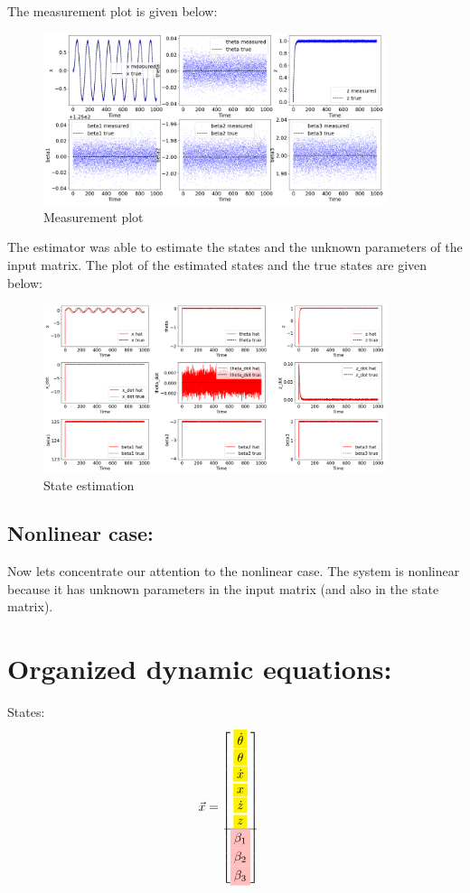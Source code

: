 \documentclass[12pt]{article}
\begin{document}
The measurement plot is given below:
\begin{figure}[h!]
    \centering
    \includegraphics[width=10cm]{figures/phase_02_measurement1.png}
    \caption{Measurement plot}
    \label{fig:03}
\end{figure}
The estimator was able to estimate the states and the unknown parameters of the input matrix. The plot of the estimated states and the true states are given below:
\begin{figure}[h!]
    \centering
    \includegraphics[width=10cm]{figures/phase_02_states1.png}
    \caption{State estimation}
    \label{fig:04}
\end{figure}

\subsection*{Nonlinear case:}
Now lets concentrate our attention to the nonlinear case. The system is nonlinear because it has unknown parameters in the input matrix (and also in the state matrix).  

\section*{Organized dynamic equations:}

States:
\begin{align*}
    \vec{x} &= \begin{bmatrix}
        \colorbox{yellow}{$\dot{\theta}$} \\
        \colorbox{yellow}{$\theta$} \\
        \colorbox{yellow}{$\dot{x}$} \\
        \colorbox{yellow}{$x$} \\
        \colorbox{yellow}{$\dot{z}$} \\
        \colorbox{yellow}{$z$} \\
        \hline
        \colorbox{pink}{$\beta_1$} \\
        \colorbox{pink}{$\beta_2$} \\
        \colorbox{pink}{$\beta_3$} \\
    \end{bmatrix}
\end{align*}
\end{document}

